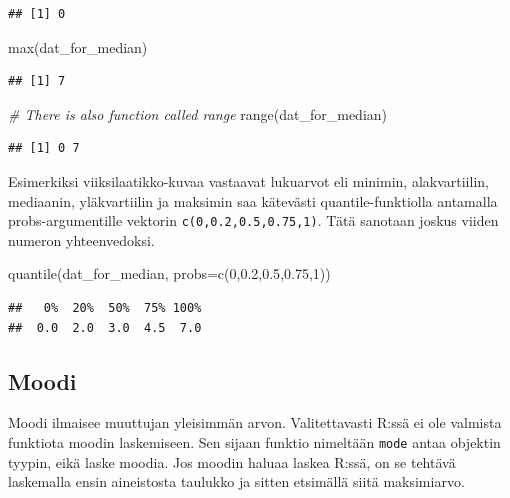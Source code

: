 \documentclass[
]{book}
\newenvironment{Shaded}{\begin{snugshade}}{\end{snugshade}}
\newcommand{\AttributeTok}[1]{\textcolor[rgb]{0.77,0.63,0.00}{#1}}
\newcommand{\CommentTok}[1]{\textcolor[rgb]{0.56,0.35,0.01}{\textit{#1}}}
\newcommand{\DecValTok}[1]{\textcolor[rgb]{0.00,0.00,0.81}{#1}}
\newcommand{\FloatTok}[1]{\textcolor[rgb]{0.00,0.00,0.81}{#1}}
\newcommand{\FunctionTok}[1]{\textcolor[rgb]{0.00,0.00,0.00}{#1}}
\newcommand{\NormalTok}[1]{#1}
\begin{document}
\begin{verbatim}
## [1] 0
\end{verbatim}

\begin{Shaded}
\begin{Highlighting}[]
\FunctionTok{max}\NormalTok{(dat\_for\_median)}
\end{Highlighting}
\end{Shaded}

\begin{verbatim}
## [1] 7
\end{verbatim}

\begin{Shaded}
\begin{Highlighting}[]
\CommentTok{\# There is also function called range}
\FunctionTok{range}\NormalTok{(dat\_for\_median)}
\end{Highlighting}
\end{Shaded}

\begin{verbatim}
## [1] 0 7
\end{verbatim}

Esimerkiksi viiksilaatikko-kuvaa vastaavat lukuarvot eli minimin, alakvartiilin, mediaanin, yläkvartiilin ja maksimin saa kätevästi quantile-funktiolla antamalla probs-argumentille vektorin \texttt{c(0,0.2,0.5,0.75,1)}. Tätä sanotaan joskus viiden numeron yhteenvedoksi.

\begin{Shaded}
\begin{Highlighting}[]
\FunctionTok{quantile}\NormalTok{(dat\_for\_median, }\AttributeTok{probs=}\FunctionTok{c}\NormalTok{(}\DecValTok{0}\NormalTok{,}\FloatTok{0.2}\NormalTok{,}\FloatTok{0.5}\NormalTok{,}\FloatTok{0.75}\NormalTok{,}\DecValTok{1}\NormalTok{))}
\end{Highlighting}
\end{Shaded}

\begin{verbatim}
##   0%  20%  50%  75% 100% 
##  0.0  2.0  3.0  4.5  7.0
\end{verbatim}

\hypertarget{moodi}{%
\subsection{Moodi}\label{moodi}}

Moodi ilmaisee muuttujan yleisimmän arvon. Valitettavasti R:ssä ei ole valmista funktiota moodin laskemiseen. Sen sijaan funktio nimeltään \texttt{mode} antaa objektin tyypin, eikä laske moodia. Jos moodin haluaa laskea R:ssä, on se tehtävä laskemalla ensin aineistosta taulukko ja sitten etsimällä siitä maksimiarvo.
\end{document}
